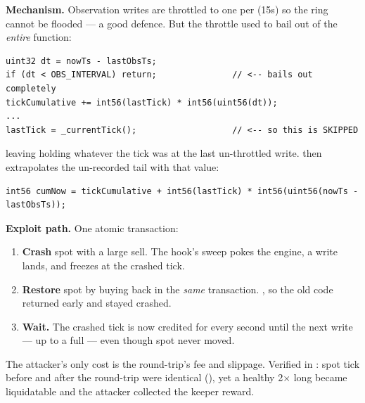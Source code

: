 

\textbf{Mechanism.} Observation writes are throttled to one per
 (15s) so the ring cannot be flooded --- a good defence. But
the throttle used to bail out of the \emph{entire} function:

\begin{lstlisting}[firstnumber=346]
uint32 dt = nowTs - lastObsTs;
if (dt < OBS_INTERVAL) return;               // <-- bails out completely
tickCumulative += int56(lastTick) * int56(uint56(dt));
...
lastTick = _currentTick();                   // <-- so this is SKIPPED
\end{lstlisting}

\noindent leaving  holding whatever the tick was at the last
un-throttled write.  then extrapolates the un-recorded tail with
that value:

\begin{lstlisting}[firstnumber=383]
int56 cumNow = tickCumulative + int56(lastTick) * int56(uint56(nowTs - lastObsTs));
\end{lstlisting}

\textbf{Exploit path.} One atomic transaction:
\begin{enumerate}
\item \textbf{Crash} spot with a large sell. The hook's  sweep
pokes the engine, a write lands, and  freezes at the crashed tick.
\item \textbf{Restore} spot by buying back in the \emph{same} transaction.
, so the old code returned early and  stayed
crashed.
\item \textbf{Wait.} The crashed tick is now credited for every second until the
next write --- up to a full  --- even though spot never moved.
\end{enumerate}

\noindent The attacker's only cost is the round-trip's fee and slippage. Verified
in : spot tick before and after the
round-trip were identical (), yet a healthy 2$\times$ long became
liquidatable and the attacker collected the keeper reward.

